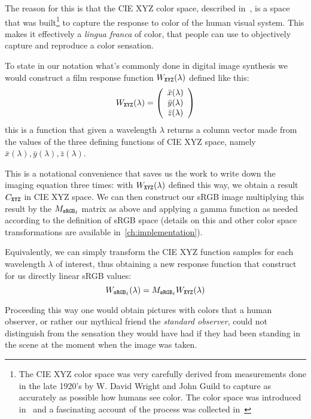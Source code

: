 The reason for this is that the \gls{CIE} \gls{XYZ} color space, described in~\cite{cie:015.2018},
is a space that was built\footnote{
	The \gls{CIE} \gls{XYZ} color space was very carefully derived from measurements
	done in the late 1920's by W. David Wright and John Guild to capture 
	as accurately as possible how humans see color. 
	The color space was introduced in~\cite{smithguild1931} and 
	a fascinating account of the process was collected in~\cite{fairman97} 
} to capture the response to color of the human visual system. 
This makes it effectively a \emph{lingua franca} of color, that people can
use to objectively capture and reproduce a color sensation.

To state in our notation what's commonly done in digital image synthesis 
we would construct a film response function $W_{\texttt{XYZ}}(\lambda)$ defined 
like this:
\begin{equation}
	W_{\texttt{XYZ}}(\lambda) = 
	\left(
	  \begin{array}{c}
	  	  \bar x(\lambda)\\ 
	  	  \bar y(\lambda)\\ 
	  	  \bar z(\lambda)
	  \end{array}
	\right)
\end{equation}
this is a function that given a wavelength $\lambda$ returns a column vector
made from the values of the three defining functions of \gls{CIE} \gls{XYZ} space,
namely $\bar x(\lambda), \bar y(\lambda), \bar z(\lambda)$.

This is a notational convenience that saves us the work to write down the
imaging equation three times: with $W_{\texttt{XYZ}}(\lambda)$ defined this way,
we obtain a result $C_{\texttt{XYZ}}$ in \gls{CIE} \gls{XYZ} space.
We can then construct our \gls{sRGB} image multiplying this result by
the $M_{\texttt{sRGB}_\ell}$ matrix as above and applying a gamma function as needed
according to the definition of \gls{sRGB} space (details on this and other 
color space transformations are available in~\cref{ch:implementation}).

Equivalently, we can simply transform the \gls{CIE} \gls{XYZ} function
samples for each wavelength $\lambda$ of interest, thus obtaining a new 
response function that construct for us directly linear \gls{sRGB} values:
\begin{displaymath}
 W_{\texttt{sRGB}_\ell}(\lambda) = M_{\texttt{sRGB}_\ell} W_{\texttt{XYZ}}(\lambda)
\end{displaymath}

Proceeding this way one would obtain pictures with colors that a human observer,
or rather our mythical friend the \emph{standard observer}, could not
distinguish from the sensation they would have had if they had been standing 
in the scene at the moment when the image was taken.


